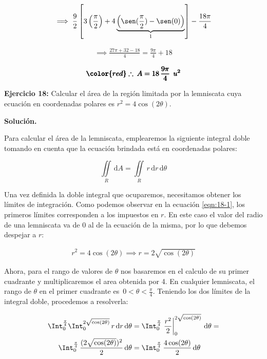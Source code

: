 \documentclass[12pt]{article}
\begin{document}
\begin{align*}
	\implies \frac{9}{2}\left[3\left(\frac{\pi}{2}\right) + 4\underbrace{\left(\sen(\frac{\pi}{2})-\sen(0)\right)}_{1} \right] - \frac{18\pi}{4}
\end{align*}

\begin{align*}
	\implies \frac{27\pi + 32 - 18}{4} = \frac{9\pi}{4} + 18
\end{align*}

\begin{align*}
	\pmb{\color{red} \therefore\: A = 18\,\frac{9\pi}{4}\: \: u^2}
\end{align*}

\noindent \textbf{Ejercicio 18:} Calcular el área de la región limitada por la lemniscata cuya ecuación en coordenadas polares es $r^2=4\cos(2\theta)$.

\vspace{5mm}

\noindent \textbf{Solución.}

\vspace{3mm}

\noindent Para calcular el área de la lemniscata, emplearemos la siguiente integral doble tomando en cuenta que la ecuación brindada está en coordenadas polares:

\begin{equation}\label{eqn:18-1}\tag{1}
	\iint\limits_R\, \mathrm{d}A = \iint\limits_R\, r\,\mathrm{d}r\,\mathrm{d}\theta
\end{equation}

\noindent Una vez definida la doble integral que ocuparemos, necesitamos obtener los límites de integración. Como podemos observar en la ecuación \eqref{eqn:18-1}, los primeros límites corresponden a los impuestos en $r$. En este caso el valor del radio de una lemniscata va de $0$ al de la ecuación de la misma, por lo que debemos despejar a $r$:

\begin{align*}
	r^2 = 4\cos(2\theta) \implies r = 2\sqrt{\cos(2\theta)}
\end{align*}

\noindent Ahora, para el rango de valores de $\theta$ nos basaremos en el calculo de su primer cuadrante y multiplicaremos el area obtenida por 4. En cualquier lemniscata, el rango de $\theta$ en el primer cuadrante es $\,0<\theta<\frac{\pi}{4}$. Teniendo los dos límites de la integral doble, procedemos a resolverla:

\begin{align*}
	\Int_{0}^{\frac{\pi}{4}} \Int_{0}^{2\sqrt{\cos(2\theta)}}\, r\,\mathrm{d}r\,\mathrm{d}\theta &= \Int_{0}^{\frac{\pi}{4}} \left.\frac{r^2}{2}\right|_{0}^{2\sqrt{\cos(2\theta)}}\,\mathrm{d}\theta = \\ \Int_{0}^{\frac{\pi}{4}}\,\frac{(2\sqrt{\cos(2\theta)})^2}{2}\,\mathrm{d}\theta &= \Int_{0}^{\frac{\pi}{4}}\, \frac{4\cos(2\theta)}{2}\,\mathrm{d}\theta
\end{align*}
\end{document}
